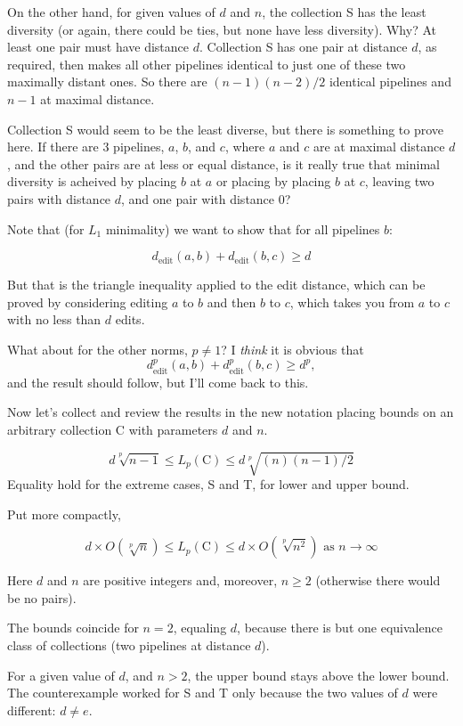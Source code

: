 \documentclass{article}
\begin{document}
On the other hand, for given values of $d$ and $n$, the collection S
has the least diversity (or again, there could be ties, but none have
less diversity).  Why?  At least one pair must have distance $d$.
Collection S has one pair at distance $d$, as required, then makes all
other pipelines identical to just one of these two maximally distant
ones.  So there are $(n-1)(n-2)/2$ identical pipelines and $n-1$ at
maximal distance.

Collection S would seem to be the least diverse, but there is
something to prove here.  If there are 3 pipelines, $a$, $b$, and $c$,
where $a$ and $c$ are at maximal distance $d$, and the other pairs are
at less or equal distance, is it really true that minimal diversity is
acheived by placing $b$ at $a$ or placing by placing $b$ at $c$,
leaving two pairs with distance $d$, and one pair with distance 0?

Note that (for $L_1$ minimality) we want to show that for all
pipelines $b$:

$$d_{\mbox{edit}}(a, b) + d_{\mbox{edit}}(b, c) \geq d$$

But that is the triangle inequality applied to the edit distance,
which can be proved by considering editing $a$ to $b$ and then $b$ to
$c$, which takes you from $a$ to $c$ with no less than $d$ edits.

What about for the other norms, $p \neq 1$?  I \emph{think} it is
obvious that
$$d^p_{\mbox{edit}}(a, b) + d^p_{\mbox{edit}}(b, c) \geq d^p,$$ and
the result should follow, but I'll come back to this.

Now let's collect and review the results in the new notation placing
bounds on an arbitrary collection C with parameters $d$ and $n$.

$$ d \sqrt[p]{n-1} \leq L_p(\mbox{C}) \leq d \sqrt[p]{(n)(n-1)/2} $$
Equality hold for the extreme cases, S and T, for lower and upper bound.

Put more compactly,

$$d \times O\left(\sqrt[p]{n}\right) \leq L_p(\mbox{C}) \leq d \times
O\left(\sqrt[p]{n^2}\right) \mbox{ as } n \rightarrow \infty$$

Here $d$ and $n$ are positive integers and, moreover, $n \geq 2$
(otherwise there would be no pairs).


The bounds coincide for $n=2$, equaling $d$, because
there is but one equivalence class of collections (two pipelines at
distance $d$).

For a given value of $d$, and $n > 2$, the upper bound stays above the
lower bound. The counterexample worked for S and T only
because the two values of $d$ were different: $d \neq e$.
\end{document}
